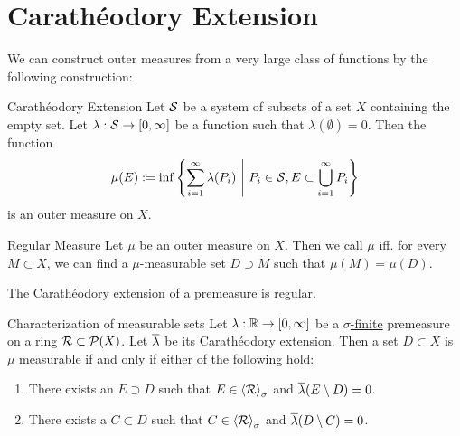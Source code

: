 \section{Carathéodory Extension}
We can construct outer measures from a very large class of functions by the following construction:
\begin{importanttheorem}{Carathéodory Extension}{}
	Let $\mathcal{S}$ be a system of subsets of a set $X$ containing the empty set. Let $\lambda : \mathcal{S} \to [0,\infty]$ be a function such that $\lambda(\emptyset) = 0$. Then the function
	\begin{align*}
		\mu(E) := \inf\lr{\sum_{i = 1}^\infty \lambda(P_i) \mid P_i \in \cS, E \subset \bigcup_{i = 1}^\infty P_i}
	\end{align*}
	is an outer measure on $X$.
\end{importanttheorem}
\begin{importantdefinition}{Regular Measure}{}
	Let $\mu$ be an outer measure on $X$. Then we call $\mu$  iff. for every $M \subset X$, we can find a $\mu$-measurable set $D \supset M$ such that $\mu(M) = \mu(D)$.
\end{importantdefinition}
\begin{lemma}
	The Carathéodory extension of a premeasure is regular.
\end{lemma}
\begin{importanttheorem}{Characterization of measurable sets}{}
	Let $\lambda : \mathbb{R} \to [0,\infty]$ be a \ul{$\sigma$-finite} premeasure on a ring $\mathcal{R} \subset \mathcal{P}(X)$. Let $\overline{{\lambda}}$ be its Carathéodory extension. Then a set $D \subset X$ is $\mu$ measurable if and only if either of the following hold:
	\begin{enumerate}
		\item There exists an $E \supset D$ such that $E \in \left\langle \mathcal{R} \right\rangle_\sigma$ and $\overline{{\lambda}}(E \setminus D) = 0$.
		\item There exists a $C \subset D$ such that $C \in \left\langle \mathcal{R} \right\rangle_\sigma$ and $\overline{{\lambda}}(D \setminus C) = 0$.
	\end{enumerate}
\end{importanttheorem}
\iffalse
